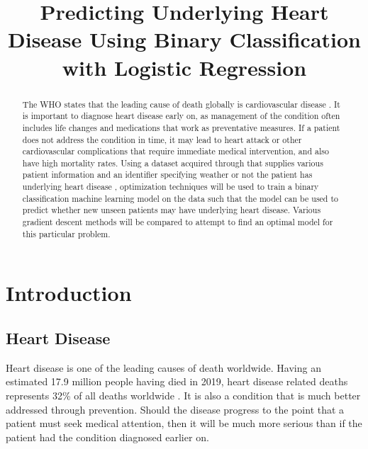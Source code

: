 \documentclass[12pt,conference]{IEEEtran}
\begin{document}
\onecolumn
\title{ Predicting Underlying Heart Disease Using Binary Classification with Logistic Regression }
\author{
}
\maketitle
\thispagestyle{plain}
\pagestyle{plain}
\begin{abstract}
The WHO states that the leading cause of death globally is cardiovascular disease \cite{who}. It is important to diagnose heart disease early on, as management of the condition often includes life changes and medications that work as preventative measures. If a patient does not address the condition in time, it may lead to heart attack or other cardiovascular complications that require immediate medical intervention, and also have high mortality rates. Using a dataset acquired through  that supplies various patient information and an identifier specifying weather or not the patient has underlying heart disease \cite{kaggle}, optimization techniques will be used to train a binary classification machine learning model on the data such that the model can be used to predict whether new unseen patients may have underlying heart disease. Various gradient descent methods will be compared to attempt to find an optimal model for this particular problem.
\end{abstract}

\section{Introduction}
\subsection{Heart Disease}
Heart disease is one of the leading causes of death worldwide. Having an estimated 17.9 million people having died in 2019, heart disease related deaths represents 32\% of all deaths worldwide \cite{who}. It is also a condition that is much better addressed through prevention. Should the disease progress to the point that a patient must seek medical attention, then it will be much more serious than if the patient had the condition diagnosed earlier on. 
\end{document}
